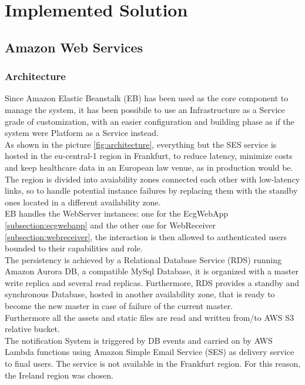 \chapter{Implemented Solution}
\section{Amazon Web Services}

\subsection{Architecture}
Since Amazon Elastic Beanstalk (EB) has been used as the core component to manage the system, it has been possibile to use an Infrastructure as a Service grade of customization, with an easier configuration and building phase as if the system were Platform as a Service instead.\\
As shown in the picture \ref{fig:architecture}, everything but the SES service is hosted in the eu-central-1 region in Frankfurt, to reduce latency, minimize costs and keep healthcare data in an European law venue, as in production would be.
The region is divided into avaiability zones connected each other with low-latency links, so to handle potential instance failures by replacing them with the standby ones located in a different availability zone.\\
EB handles the WebServer instances: one for the EcgWebApp \ref{subsection:ecgwebapp} and the other one for WebReceiver \ref{subsection:webreceiver}, the interaction is then allowed to authenticated users bounded to their capabilities and role.\\
The persistency is achieved by a Relational Database Service (RDS) running Amazon Aurora DB, a compatible MySql Database, it is organized with a master write replica and several read replicas.
Furthermore, RDS provides a standby and synchronous Database, hosted in another availability zone, that is ready to become the new master in case of failure of the current master.\\
Furthermore all the assets and static files are read and written from/to AWS S3 relative bucket.\\
The notification System is triggered by DB events and carried on by AWS Lambda functions using Amazon Simple Email Service (SES) as delivery service to final users. The service is not available in the Frankfurt region. For this reason, the Ireland region was chosen.



